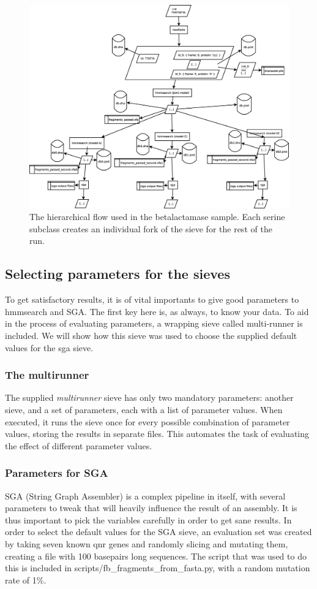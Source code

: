 \documentclass[a4paper,12pt]{article}
\begin{document}
\begin{figure}[h]
\includegraphics[width=\textwidth, keepaspectratio=true]{blflow}
\caption{The hierarchical flow used in the betalactamase sample. Each serine subclass creates an individual fork of the sieve for the rest of the run.}
\label{fig:blflow}
\end{figure}

\subsection{Selecting parameters for the sieves}

To get satisfactory results, it is of vital importants to give good parameters to hmmsearch and SGA. The first key here is, as always, to know your data. To aid in the process of evaluating parameters, a wrapping sieve called multi-runner is included. We will show how this sieve was used to choose the supplied default values for the sga sieve.

\subsubsection{The multirunner}
The supplied \emph{multirunner} sieve has only two mandatory parameters: another sieve, and a set of parameters, each with a list of parameter values. When executed, it runs the sieve once for every possible combination of parameter values, storing the results in separate files. This automates the task of evaluating the effect of different parameter values.

\subsubsection{Parameters for SGA}
SGA (String Graph Assembler) is a complex pipeline in itself, with several parameters to tweak that will heavily influence the result of an assembly. It is thus important to pick the variables carefully in order to get sane results. In order to select the default values for the SGA sieve, an evaluation set was created by taking seven known qnr genes and randomly slicing and mutating them, creating a file with 100 basepairs long sequences. The script that was used to do this is included in scripts/fb\_fragments\_from\_fasta.py, with a random mutation rate of 1\%.
\end{document}

